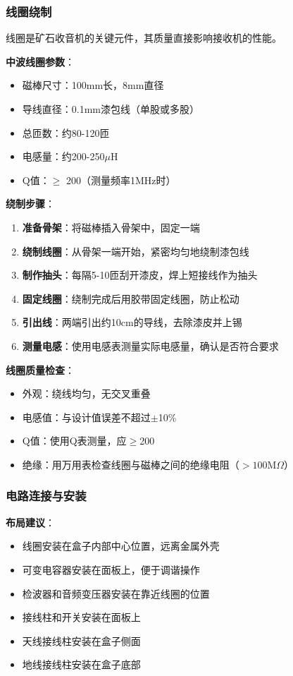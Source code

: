\subsubsection{线圈绕制}
\label{sec:crystal_radio_coil}

线圈是矿石收音机的关键元件，其质量直接影响接收机的性能。

\textbf{中波线圈参数}：
\begin{itemize}
    \item 磁棒尺寸：100mm长，8mm直径
    \item 导线直径：0.1mm漆包线（单股或多股）
    \item 总匝数：约80-120匝
    \item 电感量：约200-250$\mu$H
    \item Q值：$\geq$ 200（测量频率1MHz时）
\end{itemize}

\textbf{绕制步骤}：
\begin{enumerate}
    \item \textbf{准备骨架}：将磁棒插入骨架中，固定一端
    \item \textbf{绕制线圈}：从骨架一端开始，紧密均匀地绕制漆包线
    \item \textbf{制作抽头}：每隔5-10匝刮开漆皮，焊上短接线作为抽头
    \item \textbf{固定线圈}：绕制完成后用胶带固定线圈，防止松动
    \item \textbf{引出线}：两端引出约10cm的导线，去除漆皮并上锡
    \item \textbf{测量电感}：使用电感表测量实际电感量，确认是否符合要求
\end{enumerate}

\textbf{线圈质量检查}：
\begin{itemize}
    \item 外观：绕线均匀，无交叉重叠
    \item 电感值：与设计值误差不超过$\pm$10\%
    \item Q值：使用Q表测量，应$\geq$200
    \item 绝缘：用万用表检查线圈与磁棒之间的绝缘电阻（$>100$M$\Omega$）
\end{itemize}

\subsubsection{电路连接与安装}
\label{sec:crystal_radio_assembly}

\textbf{布局建议}：
\begin{itemize}
    \item 线圈安装在盒子内部中心位置，远离金属外壳
    \item 可变电容器安装在面板上，便于调谐操作
    \item 检波器和音频变压器安装在靠近线圈的位置
    \item 接线柱和开关安装在面板上
    \item 天线接线柱安装在盒子侧面
    \item 地线接线柱安装在盒子底部
\end{itemize}

